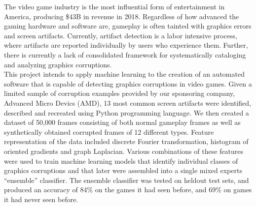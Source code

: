 



\vspace{24pt}


The video game industry is the most influential form of entertainment in America, producing \$43B in revenue in 2018. Regardless of how advanced the gaming hardware and software are, gameplay is often tainted with graphics errors and screen artifacts. Currently, artifact detection is a labor intensive process, where artifacts are reported individually by users who experience them. Further, there is currently a lack of consolidated framework for systematically cataloging and analyzing graphics corruptions. \\

\noindent
This project intends to apply machine learning to the creation of an automated software that is capable of detecting graphics corruptions in video games. Given a limited sample of corruption examples provided by our sponsoring company, Advanced Micro Devics (AMD), 13 most common screen artifacts were identified, described and recreated using Python programming language. We then created a dataset of 50,000 frames consisting of both normal gameplay frames as well as synthetically obtained corrupted frames of 12 different types. Feature representation of the data included discrete Fourier transformation, histogram of oriented gradients and graph Laplacian. Various combinations of these features were used to train machine learning models that identify individual classes of graphics corruptions and that later were assembled into a single mixed experts ``ensemble'' classifier. The ensemble classifier was tested on heldout test sets, and produced an accuracy of 84\% on the games it had seen before, and 69\% on games it had never seen before.



